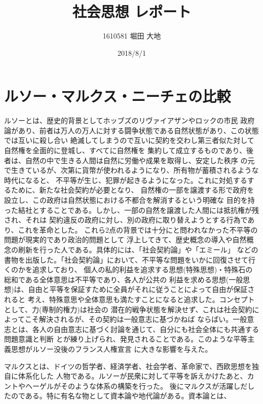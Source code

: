 \documentclass[11pt,a4j]{jsarticle}
\title{\vspace{-2.5cm}社会思想 レポート}
\author{1610581 堀田 大地}
\date{2018/8/1}
\begin{document}
\maketitle{}
\section{ルソー・マルクス・ニーチェの比較}
\par ルソーとは、歴史的背景としてホッブズのリヴァイアザンやロックの市民
政府論があり、前者は万人の万人に対する闘争状態である自然状態があり、この状態では互いに殺し合い
絶滅してしまうので互いに契約を交わし第三者似た対して自然権を全面的に登城し、すべてに自然権を
集約して成立するものであり、後者は、自然の中で生きる人間は自然に労働や成果を取得し、安定した秩序
の元で生きているが、次第に貨幣が使われるようになり、所有物が蓄積されるような時代になると、
不平等が生じ、犯罪が起きるようになった。これに対処するするために、新たな社会契約が必要となり、
自然権の一部を譲渡する形で政府を設立し、この政府は自然状態における不都合を解消するという明確な
目的を持った結社とすることである。しかし、一部の自然を譲渡した人間には抵抗権が残され、それは
契約違反の政府に対し、別の政府に取り替えようとする行為であり、これを革命とした。
これら2点の背景では十分にと問われなかった不平等の問題が現実的であり政治的問題として
浮上してきて、歴史概念の導入や自然概念の刷新を行った人である。具体的には、「社会契約論」や「エミール」
などの書物を出版した。「社会契約論」において、不平等な問題をいかに回復させて行くのかを追求しており、
個人の私的利益を追求する思想(特殊思想)・特殊石の総和である全体意思は不平等であり、各人が公共の
利益を求める思想(一般思想)は、自由と平等を保証すために全員がそれに従うことによって自由が保証されると
考え、特殊意思や全体意思も満たすことになると追求した。コンセプトとして、力(専制的権力)は社会の
潜在的戦争状態を解決せず、これは社会契約によってこそ解決されるが、その契約は一般意志に基づかねば
ならばい。一般意志とは、各人の自由意志に基づく討論を通じて、自分にも社会全体にも共通する問題意識と判断
とが練り上げられ、発見されることである。このような平等主義思想がルソー没後のフランス人権宣言
に大きな影響を与えた。
\par マルクスとは、ドイツの哲学者、経済学者、社会学者、革命家で、西欧思想を独自に体系化した
人物である。ルソーが民衆に対して平等を訴えかけたあと、カントやヘーゲルがそのような体系の構築を行った。
後にマルクスが活躍しだしたのである。特に有名な物として資本論や地代論がある。資本論とは、
\end{document}
